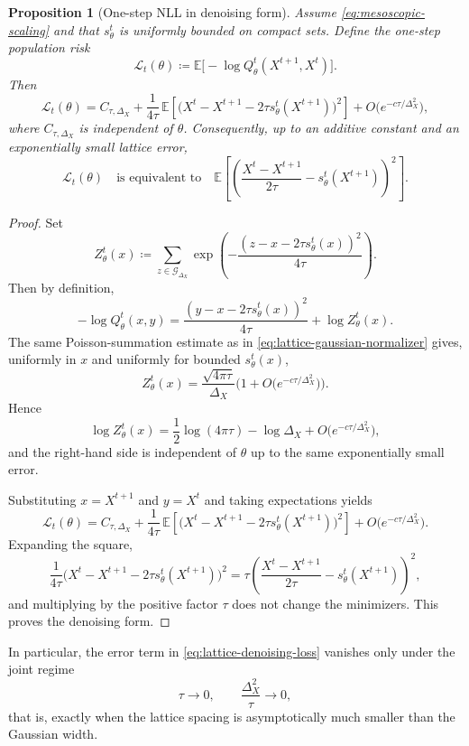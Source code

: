 \documentclass[11pt]{article}
\newtheorem{proposition}{Proposition}
\begin{document}
\begin{proposition}[One-step NLL in denoising form]
\label{prop:nll-denoising-lattice}
Assume \eqref{eq:mesoscopic-scaling} and that $s_\theta^t$ is uniformly bounded on compact sets. Define the one-step population risk
\[
\mathcal L_t(\theta)\coloneqq \mathbb E\!\big[-\log Q_\theta^t(X^{t+1},X^t)\big].
\]
Then
\begin{equation}
\label{eq:lattice-denoising-loss}
\mathcal L_t(\theta)
=
C_{\tau,\Delta_X}
+\frac{1}{4\tau}\,
\mathbb E\!\left[\big(X^t-X^{t+1}-2\tau s_\theta^t(X^{t+1})\big)^2\right]
+O\!\big(e^{-c\tau/\Delta_X^2}\big),
\end{equation}
where $C_{\tau,\Delta_X}$ is independent of $\theta$. Consequently, up to an additive constant and an exponentially small lattice error,
\[
\mathcal L_t(\theta)
\quad\text{is equivalent to}\quad
\mathbb E\!\left[
\left(
\frac{X^t-X^{t+1}}{2\tau}
-s_\theta^t(X^{t+1})
\right)^2
\right].
\]
\end{proposition}
\begin{proof}
Set
\[
Z_\theta^t(x)
\coloneqq
\sum_{z\in\mathcal G_{\Delta_X}}
\exp\!\left(-\frac{(z-x-2\tau s_\theta^t(x))^2}{4\tau}\right).
\]
Then by definition,
\[
-\log Q_\theta^t(x,y)
=
\frac{(y-x-2\tau s_\theta^t(x))^2}{4\tau}
+\log Z_\theta^t(x).
\]
The same Poisson-summation estimate as in \eqref{eq:lattice-gaussian-normalizer} gives, uniformly in $x$ and uniformly for bounded $s_\theta^t(x)$,
\[
Z_\theta^t(x)
=
\frac{\sqrt{4\pi\tau}}{\Delta_X}
\Big(1+O\!\big(e^{-c\tau/\Delta_X^2}\big)\Big).
\]
Hence
\[
\log Z_\theta^t(x)
=
\frac12\log(4\pi\tau)-\log \Delta_X
+O\!\big(e^{-c\tau/\Delta_X^2}\big),
\]
and the right-hand side is independent of $\theta$ up to the same exponentially small error.

Substituting $x=X^{t+1}$ and $y=X^t$ and taking expectations yields
\[
\mathcal L_t(\theta)
=
C_{\tau,\Delta_X}
+\frac{1}{4\tau}\,
\mathbb E\!\left[\big(X^t-X^{t+1}-2\tau s_\theta^t(X^{t+1})\big)^2\right]
+O\!\big(e^{-c\tau/\Delta_X^2}\big).
\]
Expanding the square,
\[
\frac{1}{4\tau}\big(X^t-X^{t+1}-2\tau s_\theta^t(X^{t+1})\big)^2
=
\tau\left(\frac{X^t-X^{t+1}}{2\tau}-s_\theta^t(X^{t+1})\right)^2,
\]
and multiplying by the positive factor $\tau$ does not change the minimizers. This proves the denoising form.
\end{proof}

In particular, the error term in \eqref{eq:lattice-denoising-loss} vanishes only under the joint regime
\[
\tau\to0,
\qquad
\frac{\Delta_X^2}{\tau}\to0,
\]
that is, exactly when the lattice spacing is asymptotically much smaller than the Gaussian width.
\end{document}
